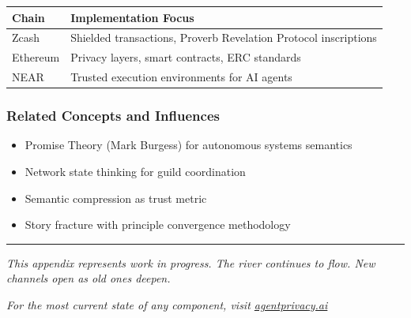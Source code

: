 \documentclass[
]{article}
\newcounter{none} %
\providecommand{\tightlist}{%
  \setlength{\itemsep}{0pt}\setlength{\parskip}{0pt}}
\begin{document}
{\def\LTcaptype{none} %
\begin{longtable}[]{@{}
  >{\raggedright\arraybackslash}p{}
  >{\raggedright\arraybackslash}p{}@{}}
\toprule\noalign{}
\begin{minipage}[b]{\linewidth}\raggedright
Chain
\end{minipage} & \begin{minipage}[b]{\linewidth}\raggedright
Implementation Focus
\end{minipage} \\
\midrule\noalign{}
\endhead
\bottomrule\noalign{}
\endlastfoot
Zcash & Shielded transactions, Proverb Revelation Protocol
inscriptions \\
Ethereum & Privacy layers, smart contracts, ERC standards \\
NEAR & Trusted execution environments for AI agents \\
\end{longtable}
}

\subsubsection{Related Concepts and
Influences}\label{related-concepts-and-influences}

\begin{itemize}
\tightlist
\item
  Promise Theory (Mark Burgess) for autonomous systems semantics
\item
  Network state thinking for guild coordination
\item
  Semantic compression as trust metric
\item
  Story fracture with principle convergence methodology
\end{itemize}

\begin{center}\rule{0.5\linewidth}{0.5pt}\end{center}

\emph{This appendix represents work in progress. The river continues to
flow. New channels open as old ones deepen.}

\emph{For the most current state of any component, visit
\href{https://agentprivacy.ai}{agentprivacy.ai}}
\end{document}

